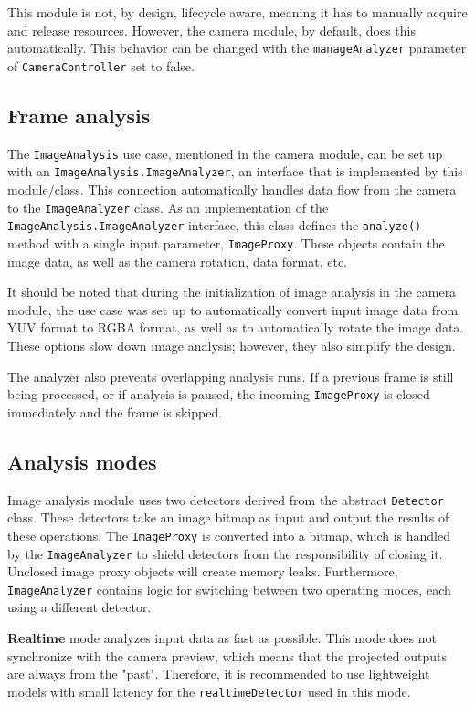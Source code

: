 This module is not, by design, lifecycle aware, meaning it has to manually acquire and release resources. However, the camera module, by default, does this automatically. This behavior can be changed with the \texttt{manageAnalyzer} parameter of \texttt{CameraController} set to false.


\subsection{Frame analysis}
The \texttt{ImageAnalysis} use case, mentioned in the camera module, can be set up with an \texttt{ImageAnalysis.ImageAnalyzer}, an interface that is implemented by this module/class. This connection automatically handles data flow from the camera to the \texttt{ImageAnalyzer} class. As an implementation of the \texttt{ImageAnalysis.ImageAnalyzer} interface, this class defines the \texttt{analyze()} method with a single input parameter, \texttt{ImageProxy}. These objects contain the image data, as well as the camera rotation, data format, etc. 

It should be noted that during the initialization of image analysis in the camera module, the use case was set up to automatically convert input image data from YUV format to RGBA format, as well as to automatically rotate the image data. These options slow down image analysis; however, they also simplify the design.

The analyzer also prevents overlapping analysis runs. If a previous frame is still being processed, or if analysis is paused, the incoming \texttt{ImageProxy} is closed immediately and the frame is skipped.

\subsection{Analysis modes}
Image analysis module uses two detectors derived from the abstract \texttt{Detector} class. These detectors take an image bitmap as input and output the results of these operations. The \texttt{ImageProxy} is converted into a bitmap, which is handled by the \texttt{ImageAnalyzer} to shield detectors from the responsibility of closing it. Unclosed image proxy objects will create memory leaks. Furthermore, \texttt{ImageAnalyzer} contains logic for switching between two operating modes, each using a different detector. 

\textbf{Realtime} mode analyzes input data as fast as possible. This mode does not synchronize with the camera preview, which means that the projected outputs are always from the "past". Therefore, it is recommended to use lightweight models with small latency for the \texttt{realtimeDetector} used in this mode.

